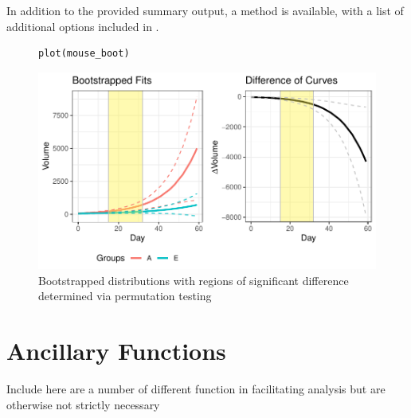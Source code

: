 In addition to the provided summary output, a  method is available, with a list of additional options included in .

\begin{figure}[H]
\centering
\begin{BVerbatim}
plot(mouse_boot)
\end{BVerbatim}

\includegraphics{img/mouse_boot_plot.pdf}
\caption{Bootstrapped distributions with regions of significant difference determined via permutation testing }
\end{figure}
%
%
%
%


\section{Ancillary Functions}

Include here are a number of different function in  facilitating  analysis but are otherwise not strictly necessary

